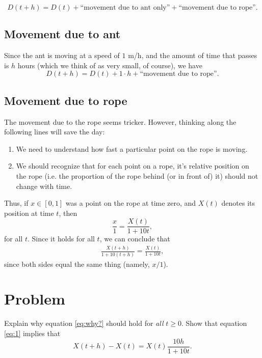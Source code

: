 \[
D(t+h) = D(t) + \text{``movement due to ant only''} + \text{``movement
  due to rope''}.
\]

\subsection{Movement due to ant}
Since the ant is moving at a speed of $1$ m/h, and the amount of time
that passes is $h$ hours (which we think of as very small, of course),
we have
\[
D(t+h) = D(t) + 1 \cdot h + \text{``movement due to rope''}.
\]

\subsection{Movement due to rope}
The movement due to the rope seems tricker.  However, thinking along
the following lines will save the day:
\begin{enumerate}
\item We need to understand how fast a particular point on the rope is
  moving.
\item We should recognize that for each point on a rope, it's relative
  position on the rope (i.e. the proportion of the rope behind (or in
  front of) it) should not change with time.
\end{enumerate}

Thus, if $x\in [0,1]$ was a point on the rope at time zero, and $X(t)$
denotes its position at time $t$, then
\begin{equation}\label{eq:why?}
  \frac{x}{1} = \frac{X(t)}{1 + 10 t},
\end{equation}
for all $t$.  Since it holds for all $t$, we can conclude that
\begin{align}\label{eq:1}
  \frac{X(t+h)}{1 + 10(t+h)} = \frac{X(t)}{1 + 10 t},
\end{align}
since both sides equal the same thing (namely, $x/1$).

\section{Problem}
\problemfont
\problem
  Explain why equation \eqref{eq:why?} should hold for \textit{all} $t
  \ge 0$.  Show that equation \eqref{eq:1} implies that
  \begin{equation}\label{eq:from_rope}
    X(t + h) - X(t) = X(t) \frac{10 h}{1 + 10 t}.
  \end{equation}
\noproblemfont

